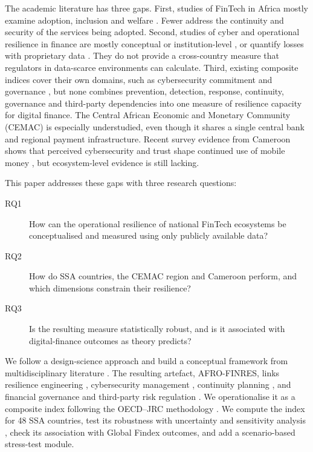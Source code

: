 \documentclass[fintech,article,submit,pdftex,moreauthors]{Definitions/mdpi}
\begin{document}
The academic literature has three gaps. First, studies of FinTech in Africa mostly examine adoption, inclusion and welfare \citep{Ozili2018,Ahmad2020,Johnen2023}. Fewer address the continuity and security of the services being adopted. Second, studies of cyber and operational resilience in finance are mostly conceptual or institution-level \citep{Dupont2019,Milkau2021,Iyer2024}, or quantify losses with proprietary data \citep{Bouveret2019}. They do not provide a cross-country measure that regulators in data-scarce environments can calculate. Third, existing composite indices cover their own domains, such as cybersecurity commitment \citep{ITU2024GCI} and governance \citep{Kaufmann2011}, but none combines prevention, detection, response, continuity, governance and third-party dependencies into one measure of resilience capacity for digital finance. The Central African Economic and Monetary Community (CEMAC) is especially understudied, even though it shares a single central bank and regional payment infrastructure. Recent survey evidence from Cameroon shows that perceived cybersecurity and trust shape continued use of mobile money \citep{Mvogo2026}, but ecosystem-level evidence is still lacking.

This paper addresses these gaps with three research questions:
\begin{description}
  \item[RQ1] How can the operational resilience of national FinTech ecosystems be conceptualised and measured using only publicly available data?
  \item[RQ2] How do SSA countries, the CEMAC region and Cameroon perform, and which dimensions constrain their resilience?
  \item[RQ3] Is the resulting measure statistically robust, and is it associated with digital-finance outcomes as theory predicts?
\end{description}

We follow a design-science approach \citep{Hevner2004,Peffers2007} and build a conceptual framework from multidisciplinary literature \citep{Jabareen2009}. The resulting artefact, AFRO-FINRES, links resilience engineering \citep{Holling1973,Bruneau2003,Linkov2018}, cybersecurity management \citep{NIST2024}, continuity planning \citep{Swanson2010,ISO22301}, and financial governance and third-party risk regulation \citep{BCBS2021,FSB2023}. We operationalise it as a composite index following the OECD--JRC methodology \citep{OECD2008}. We compute the index for 48 SSA countries, test its robustness with uncertainty and sensitivity analysis \citep{Saisana2005,Greco2018}, check its association with Global Findex outcomes, and add a scenario-based stress-test module.
\end{document}
